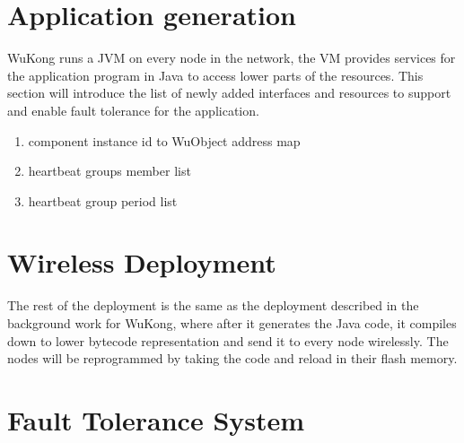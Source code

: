 \section{Application generation}

WuKong runs a JVM on every node in the network, the VM provides services for
the application program in Java to access lower parts of the resources.
This section will introduce the list of newly added interfaces and resources to
support and enable fault tolerance for the application.

\begin{enumerate}
\item component instance id to WuObject address map
\item heartbeat groups member list
\item heartbeat group period list
\end{enumerate}

\section{Wireless Deployment}

The rest of the deployment is the same as the deployment described in the
background work for WuKong, where after it generates the Java code, it compiles
down to lower bytecode representation and send it to every node wirelessly. The
nodes will be reprogrammed by taking the code and reload in their flash memory.

\section{Fault Tolerance System}

